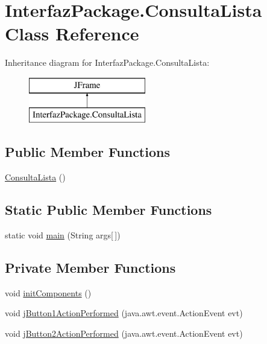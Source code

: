 \hypertarget{class_interfaz_package_1_1_consulta_lista}{}\section{Interfaz\+Package.\+Consulta\+Lista Class Reference}
\label{class_interfaz_package_1_1_consulta_lista}
Inheritance diagram for Interfaz\+Package.\+Consulta\+Lista\+:\begin{figure}[H]
\begin{center}
\leavevmode
\includegraphics[height=2.000000cm]{class_interfaz_package_1_1_consulta_lista}
\end{center}
\end{figure}
\subsection*{Public Member Functions}
\begin{DoxyCompactItemize}
\item 
\mbox{\hyperlink{class_interfaz_package_1_1_consulta_lista_ae50be7402a33e7d40901ce450fe3d95b}{Consulta\+Lista}} ()
\end{DoxyCompactItemize}
\subsection*{Static Public Member Functions}
\begin{DoxyCompactItemize}
\item 
static void \mbox{\hyperlink{class_interfaz_package_1_1_consulta_lista_a2826ed220b0d839325569014a77e1bde}{main}} (String args\mbox{[}$\,$\mbox{]})
\end{DoxyCompactItemize}
\subsection*{Private Member Functions}
\begin{DoxyCompactItemize}
\item 
void \mbox{\hyperlink{class_interfaz_package_1_1_consulta_lista_aae3ab18bcc107fb71521a4c09591c108}{init\+Components}} ()
\item 
void \mbox{\hyperlink{class_interfaz_package_1_1_consulta_lista_a2924138ab98bafcc86ec498cfaf1d3c4}{j\+Button1\+Action\+Performed}} (java.\+awt.\+event.\+Action\+Event evt)
\item 
void \mbox{\hyperlink{class_interfaz_package_1_1_consulta_lista_af864b1171ca3a578174fd3dd0904f212}{j\+Button2\+Action\+Performed}} (java.\+awt.\+event.\+Action\+Event evt)
\end{DoxyCompactItemize}
